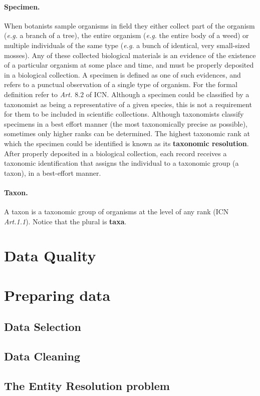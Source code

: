 \paragraph*{Specimen.}
When botanists sample organisms in field they either collect part of the organism (\textit{e.g.} a branch of a tree), the entire organism (\textit{e.g.} the entire body of a weed) or multiple individuals of the same type (\textit{e.g.} a bunch of identical, very small-sized mosses). 
Any of these collected biological materials is an evidence of the existence of a particular organism at some place and time, and must be properly deposited in a biological collection. A specimen is defined as one of such evidences, and refers to a punctual observation of a single type of organism. For the formal definition refer to \textit{Art. $8.2$} of ICN. 
Although a specimen could be classified by a taxonomist as being a representative of a given species, this is not a requirement for them to be included in scientific collections. Although taxonomists classify specimens in a best effort manner (the most taxonomically precise as possible), sometimes only higher ranks can be determined. The highest taxonomic rank at which the specimen could be identified is known as its \textbf{taxonomic resolution}.
After properly deposited in a biological collection, each record receives a taxonomic identification that assigns the individual to a taxonomic group (a taxon), in a best-effort manner.

\paragraph*{Taxon.}

A taxon is a taxonomic group of organisms at the level of any rank (ICN \textit{Art.1.1}). Notice that the plural is \textbf{taxa}.




\section{Data Quality}

\section{Preparing data}
\subsection{Data Selection}
\subsection{Data Cleaning}
\subsection{The Entity Resolution problem}
